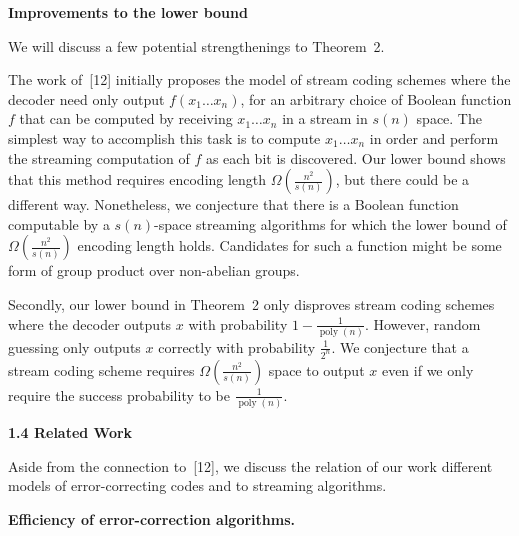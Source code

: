 \documentclass[10pt,a4paper]{article}
\begin{document}
\par\medskip\noindent\textbf{Improvements to the lower bound}\par




We will discuss a few potential strengthenings to Theorem 2.\par




The work of [12] initially proposes the model of stream coding schemes where the decoder need only output $f(x_{1}\ldots x_{n})$, for an arbitrary choice of Boolean function $f$ that can be computed by receiving $x_{1}\ldots x_{n}$ in a stream in $s(n)$ space. The simplest way to accomplish this task is to compute $x_{1}\ldots x_{n}$ in order and perform the streaming computation of $f$ as each bit is discovered. Our lower bound shows that this method requires encoding length $\Omega\left(\frac{n^{2}}{s(n)}\right)$, but there could be a different way. Nonetheless, we conjecture that there is a Boolean function computable by a $s(n)$-space streaming algorithms for which the lower bound of $\Omega\left(\frac{n^{2}}{s(n)}\right)$ encoding length holds. Candidates for such a function might be some form of group product over non-abelian groups.\par




Secondly, our lower bound in Theorem 2 only disproves stream coding schemes where the decoder outputs $x$ with probability $1-\frac{1}{\operatorname{poly}(n)}$. However, random guessing only outputs $x$ correctly with probability $\frac{1}{2^{n}}$. We conjecture that a stream coding scheme requires $\Omega\left(\frac{n^{2}}{s(n)}\right)$ space to output $x$ even if we only require the success probability to be $\frac{1}{\operatorname{poly}(n)}$.\par






\par\medskip\noindent\textbf{
1.4 Related Work}\par




Aside from the connection to [12], we discuss the relation of our work different models of error-correcting codes and to streaming algorithms.\par




\par\medskip\noindent\textbf{Efficiency of error-correction algorithms.}\par
\end{document}
